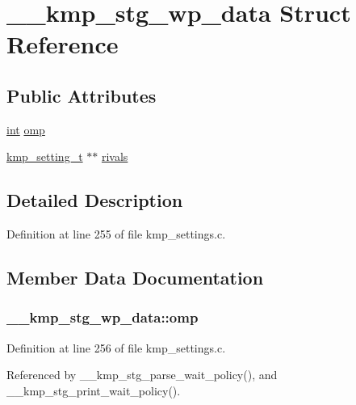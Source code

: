 \hypertarget{struct____kmp__stg__wp__data}{\section{\-\_\-\-\_\-kmp\-\_\-stg\-\_\-wp\-\_\-data Struct Reference}
\label{struct____kmp__stg__wp__data}
}
\subsection*{Public Attributes}
\begin{DoxyCompactItemize}
\item 
\hyperlink{ittnotify__static_8h_a8b8dcd723308a8cb5d84277c7a3fff70}{int} \hyperlink{struct____kmp__stg__wp__data_ad886752a07f6f26c4fbdbd081b47bc72}{omp}
\item 
\hyperlink{kmp__settings_8c_a77bbb2b0026d9ec5b857e91c44872932}{kmp\-\_\-setting\-\_\-t} $\ast$$\ast$ \hyperlink{struct____kmp__stg__wp__data_aae110667e11fd8e5771c95e2b78b1488}{rivals}
\end{DoxyCompactItemize}


\subsection{Detailed Description}


Definition at line 255 of file kmp\-\_\-settings.\-c.



\subsection{Member Data Documentation}
\hypertarget{struct____kmp__stg__wp__data_ad886752a07f6f26c4fbdbd081b47bc72}{
\subsubsection[{omp}]{ \-\_\-\-\_\-kmp\-\_\-stg\-\_\-wp\-\_\-data\-::omp}}\label{struct____kmp__stg__wp__data_ad886752a07f6f26c4fbdbd081b47bc72}


Definition at line 256 of file kmp\-\_\-settings.\-c.



Referenced by \-\_\-\-\_\-kmp\-\_\-stg\-\_\-parse\-\_\-wait\-\_\-policy(), and \-\_\-\-\_\-kmp\-\_\-stg\-\_\-print\-\_\-wait\-\_\-policy().


